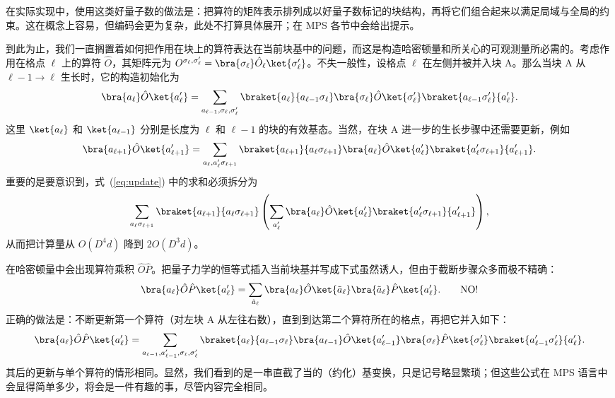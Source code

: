在实际实现中，使用这类好量子数的做法是：把算符的矩阵表示排列成以好量子数标记的块结构，再将它们组合起来以满足局域与全局的约束。这在概念上容易，但编码会更为复杂，此处不打算具体展开；在 MPS 各节中会给出提示。

到此为止，我们一直搁置着如何把作用在块上的算符表达在当前块基中的问题，而这是构造哈密顿量和所关心的可观测量所必需的。考虑作用在格点 $\ell$ 上的算符 $\hat{O}$，其矩阵元为 $O^{\sigma_\ell,\sigma'_\ell}=\bra{\sigma_\ell} \hat{O}_{\ell} \ket{\sigma'_\ell}$。不失一般性，设格点 $\ell$ 在左侧并被并入块 A。那么当块 A 从 $\ell-1 \rightarrow \ell$ 生长时，它的构造初始化为
\begin{equation}
\bra{a_\ell} \hat{O} \ket{a'_\ell} = \sum_{a_{\ell-1},\sigma_\ell,\sigma'_\ell}
\braket{a_\ell}{a_{\ell-1}\sigma_\ell} \bra{\sigma_\ell} \hat{O} \ket{\sigma'_\ell} \braket{a_{\ell-1}\sigma'_\ell}{a'_\ell} .
\end{equation}
这里 $\ket{a_\ell}$ 和 $\ket{a_{\ell-1}}$ 分别是长度为 $\ell$ 和 $\ell-1$ 的块的有效基态。当然，在块 A 进一步的生长步骤中还需要更新，例如
\begin{equation}
\bra{a_{\ell+1}} \hat{O} \ket{a'_{\ell+1}} = \sum_{a_{\ell},a'_{\ell}\sigma_{\ell+1}}
\braket{a_{\ell+1}}{a_{\ell}\sigma_{\ell+1}} \bra{a_\ell} \hat{O} \ket{a'_\ell} \braket{a'_{\ell}\sigma_{\ell+1}}{a'_{\ell+1}} .
\label{eq:update}
\end{equation}
重要的是要意识到，式~(\ref{eq:update}) 中的求和必须拆分为
\begin{equation}
\sum_{a_{\ell}\sigma_{\ell+1}} \braket{a_{\ell+1}}{a_{\ell}\sigma_{\ell+1}} \left( \sum_{a'_{\ell}}
 \bra{a_\ell} \hat{O} \ket{a'_\ell} \braket{a'_{\ell}\sigma_{\ell+1}}{a'_{\ell+1}} \right),
\end{equation}
从而把计算量从 $O(D^4 d)$ 降到 $2O(D^3 d)$。

在哈密顿量中会出现算符乘积 $\hat{O}\hat{P}$。把量子力学的恒等式插入当前块基并写成下式虽然诱人，但由于截断步骤众多而极不精确：
\begin{equation}
\bra{a_\ell} \hat{O}\hat{P} \ket{a'_\ell} = \sum_{\tilde{a}_\ell} \bra{a_\ell} \hat{O} \ket{\tilde{a}_\ell} \bra{\tilde{a}_\ell} \hat{P} \ket{a'_\ell} . \quad\quad {\rm NO!}
\end{equation}
正确的做法是：不断更新第一个算符（对左块 A 从左往右数），直到到达第二个算符所在的格点，再把它并入如下：
\begin{equation}
\bra{a_\ell} \hat{O} \hat{P} \ket{a'_\ell} = \sum_{a_{\ell-1},a'_{\ell-1},\sigma_\ell,\sigma'_\ell}
\braket{a_\ell}{a_{\ell-1}\sigma_\ell}  \bra{a_{\ell-1}} \hat{O} \ket{a'_{\ell-1}} \bra{\sigma_\ell} \hat{P} \ket{\sigma'_\ell} \braket{a'_{\ell-1}\sigma'_\ell}{a'_\ell} .
\label{eq:incorporate}
\end{equation}
其后的更新与单个算符的情形相同。显然，我们看到的是一串直截了当的（约化）基变换，只是记号略显繁琐；但这些公式在 MPS 语言中会显得简单多少，将会是一件有趣的事，尽管内容完全相同。



